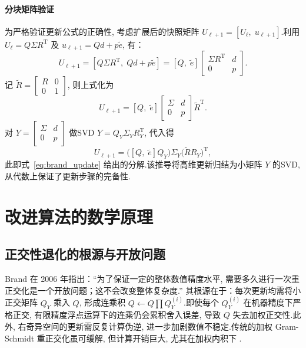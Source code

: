 \paragraph{分块矩阵验证} 为严格验证更新公式的正确性, 考虑扩展后的快照矩阵 $U_{\ell+1}=[U_\ell,\;u_{\ell+1}]$.利用 $U_\ell=Q\Sigma R^{\mathrm T}$ 及 $u_{\ell+1}=Q d + p\tilde e$, 有：
\begin{equation}
U_{\ell+1}=[Q\Sigma R^{\mathrm T},\; Q d + p\tilde e] = [Q,\; \tilde e] \begin{bmatrix} \Sigma R^{\mathrm T} & d \\ 0 & p \end{bmatrix}.
\end{equation}
记 $\tilde R = \begin{bmatrix} R & 0 \\ 0 & 1 \end{bmatrix}$, 则上式化为
\begin{equation}
U_{\ell+1}=[Q,\;\tilde e] \begin{bmatrix} \Sigma & d \\ 0 & p \end{bmatrix} \tilde R^{\mathrm T}.
\end{equation}
对 $Y=\begin{bmatrix} \Sigma & d \\ 0 & p \end{bmatrix}$ 做SVD $Y=Q_Y\Sigma_Y R_Y^{\mathrm T}$, 代入得
\begin{equation}
U_{\ell+1}= \bigl([Q,\;\tilde e] Q_Y\bigr) \Sigma_Y \bigl(\tilde R R_Y\bigr)^{\mathrm T},
\end{equation}
此即式~\eqref{eq:brand_update} 给出的分解.该推导将高维更新归结为小矩阵 $Y$ 的SVD, 从代数上保证了更新步骤的完备性.

\section{改进算法的数学原理}
\label{sec:improved}

\subsection{正交性退化的根源与开放问题}
Brand 在 2006 年指出：“为了保证一定的整体数值精度水平, 需要多久进行一次重正交化是一个开放问题；这不会改变整体复杂度.”\cite{brand2006} 其根源在于：每次更新均需将小正交矩阵 $Q_Y$ 乘入 $Q$, 形成连乘积 $Q\leftarrow Q\prod Q_Y^{(i)}$.即使每个 $Q_Y^{(i)}$ 在机器精度下严格正交, 有限精度浮点运算下的连乘仍会累积舍入误差, 导致 $Q$ 失去加权正交性.此外, 右奇异空间的更新需反复计算伪逆, 进一步加剧数值不稳定.传统的加权 Gram-Schmidt 重正交化虽可缓解, 但计算开销巨大, 尤其在加权内积下 \cite{fareed2018}.

